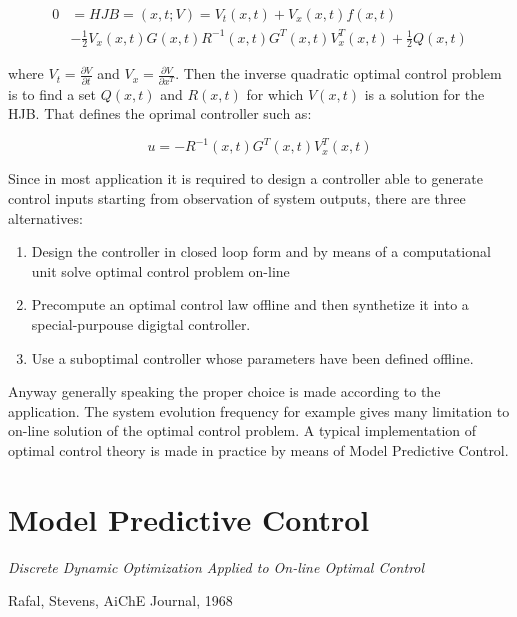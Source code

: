 \begin{equation}
	\begin{split}
		0&=HJB=(x,t;V)=V_t(x,t)+V_x(x,t)f(x,t) \\
		&-\frac{1}{2}		V_x(x,t)G(x,t)R^{-1 }		(x,t)G^T(x,t)V_x^T(x,t)+\frac{1}{2}Q(x,t)
\end{split}
\end{equation}

where $V_t=\frac{\partial V}{\partial t}$ and $V_x=\frac{\partial V}{\partial x^T}$. Then the inverse quadratic optimal control problem is to find a set $Q(x,t)$ and $R(x,t)$ for which $V(x,t)$ is a solution for the HJB. That defines the oprimal controller such as:

\begin{equation}
	u=-R^{-1}(x,t)G^T(x,t)V_x^T(x,t) 
\end{equation}

Since in most application it is required to design a controller able to generate control inputs starting from observation of system outputs, there are three alternatives: 

\begin{enumerate}
\item Design the controller in closed loop form and by means of a computational unit solve optimal control problem on-line
\item Precompute an optimal control law offline and then synthetize it into a special-purpouse digigtal controller.
\item Use a suboptimal controller whose parameters have been defined offline. 
\end{enumerate}

Anyway generally speaking the proper choice is made according to the application. The system evolution frequency for example gives many limitation to on-line solution of the optimal control problem. 
A typical implementation of optimal control theory is made in practice by means of Model Predictive Control. 

\section{Model Predictive Control}
\label{section_MPC}

\epigraph{\textit{Discrete Dynamic Optimization Applied to On-line Optimal Control}}{\begin{scriptsize}
Rafal, Stevens, AiChE Journal, 1968
\end{scriptsize}}

